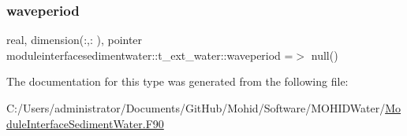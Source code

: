 \subsubsection{\texorpdfstring{waveperiod}{waveperiod}}
{\footnotesize\ttfamily real, dimension(\+:,\+:  ), pointer moduleinterfacesedimentwater\+::t\+\_\+ext\+\_\+water\+::waveperiod =$>$ null()\hspace{0.3cm}{\ttfamily [private]}}



The documentation for this type was generated from the following file\+:\begin{DoxyCompactItemize}
\item 
C\+:/\+Users/administrator/\+Documents/\+Git\+Hub/\+Mohid/\+Software/\+M\+O\+H\+I\+D\+Water/\mbox{\hyperlink{_module_interface_sediment_water_8_f90}{Module\+Interface\+Sediment\+Water.\+F90}}\end{DoxyCompactItemize}
